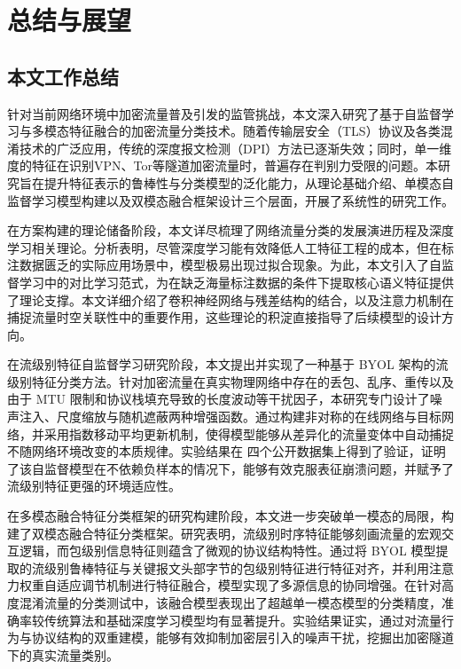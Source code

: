 
\chapter{总结与展望}

\section{本文工作总结}
针对当前网络环境中加密流量普及引发的监管挑战，本文深入研究了基于自监督学习与多模态特征融合的加密流量分类技术。随着传输层安全（TLS）协议及各类混淆技术的广泛应用，传统的深度报文检测（DPI）方法已逐渐失效；同时，单一维度的特征在识别VPN、Tor等隧道加密流量时，普遍存在判别力受限的问题。本研究旨在提升特征表示的鲁棒性与分类模型的泛化能力，从理论基础介绍、单模态自监督学习模型构建以及双模态融合框架设计三个层面，开展了系统性的研究工作。

在方案构建的理论储备阶段，本文详尽梳理了网络流量分类的发展演进历程及深度学习相关理论。分析表明，尽管深度学习能有效降低人工特征工程的成本，但在标注数据匮乏的实际应用场景中，模型极易出现过拟合现象。为此，本文引入了自监督学习中的对比学习范式，为在缺乏海量标注数据的条件下提取核心语义特征提供了理论支撑。本文详细介绍了卷积神经网络与残差结构的结合，以及注意力机制在捕捉流量时空关联性中的重要作用，这些理论的积淀直接指导了后续模型的设计方向。

在流级别特征自监督学习研究阶段，本文提出并实现了一种基于 BYOL 架构的流级别特征分类方法。针对加密流量在真实物理网络中存在的丢包、乱序、重传以及由于 MTU 限制和协议栈填充导致的长度波动等干扰因子，本研究专门设计了噪声注入、尺度缩放与随机遮蔽两种增强函数。通过构建非对称的在线网络与目标网络，并采用指数移动平均更新机制，使得模型能够从差异化的流量变体中自动捕捉不随网络环境改变的本质规律。实验结果在 四个公开数据集上得到了验证，证明了该自监督模型在不依赖负样本的情况下，能够有效克服表征崩溃问题，并赋予了流级别特征更强的环境适应性。

在多模态融合特征分类框架的研究构建阶段，本文进一步突破单一模态的局限，构建了双模态融合特征分类框架。研究表明，流级别时序特征能够刻画流量的宏观交互逻辑，而包级别信息特征则蕴含了微观的协议结构特性。通过将 BYOL 模型提取的流级别鲁棒特征与关键报文头部字节的包级别特征进行特征对齐，并利用注意力权重自适应调节机制进行特征融合，模型实现了多源信息的协同增强。在针对高度混淆流量的分类测试中，该融合模型表现出了超越单一模态模型的分类精度，准确率较传统算法和基础深度学习模型均有显著提升。实验结果证实，通过对流量行为与协议结构的双重建模，能够有效抑制加密层引入的噪声干扰，挖掘出加密隧道下的真实流量类别。

